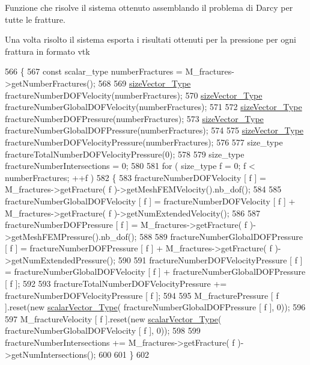 Funzione che risolve il sistema ottenuto assemblando il problema di Darcy per tutte le fratture. 

Una volta risolto il sistema esporta i risultati ottenuti per la pressione per ogni frattura in formato vtk 
\begin{DoxyCode}
566 \{  
567     \textcolor{keyword}{const} scalar\_type numberFractures = M\_fractures->getNumberFractures();
568    
569     \hyperlink{Core_8h_a83c51913d041a5001e8683434c09857f}{sizeVector\_Type} fractureNumberDOFVelocity(numberFractures);
570     \hyperlink{Core_8h_a83c51913d041a5001e8683434c09857f}{sizeVector\_Type} fractureNumberGlobalDOFVelocity(numberFractures);
571 
572     \hyperlink{Core_8h_a83c51913d041a5001e8683434c09857f}{sizeVector\_Type} fractureNumberDOFPressure(numberFractures);
573     \hyperlink{Core_8h_a83c51913d041a5001e8683434c09857f}{sizeVector\_Type} fractureNumberGlobalDOFPressure(numberFractures);
574 
575     \hyperlink{Core_8h_a83c51913d041a5001e8683434c09857f}{sizeVector\_Type} fractureNumberDOFVelocityPressure(numberFractures);
576 
577     size\_type fractureTotalNumberDOFVelocityPressure(0);
578 
579     size\_type fractureNumberIntersections = 0;
580 
581     \textcolor{keywordflow}{for} ( size\_type f = 0; f < numberFractures; ++f )
582     \{
583         fractureNumberDOFVelocity [ f ] = M\_fractures->getFracture( f )->getMeshFEMVelocity().nb\_dof();
584 
585         fractureNumberGlobalDOFVelocity [ f ] = fractureNumberDOFVelocity [ f ] + M\_fractures->getFracture(
       f )->getNumExtendedVelocity();
586 
587         fractureNumberDOFPressure [ f ] = M\_fractures->getFracture( f )->getMeshFEMPressure().nb\_dof();
588 
589         fractureNumberGlobalDOFPressure [ f ] = fractureNumberDOFPressure [ f ] + M\_fractures->getFracture(
       f )->getNumExtendedPressure();
590 
591         fractureNumberDOFVelocityPressure [ f ] = fractureNumberGlobalDOFVelocity [ f ] + 
      fractureNumberGlobalDOFPressure [ f ];
592 
593         fractureTotalNumberDOFVelocityPressure += fractureNumberDOFVelocityPressure [ f ];
594 
595         M\_fracturePressure [ f ].reset(\textcolor{keyword}{new} \hyperlink{Core_8h_a4e75b5863535ba1dd79942de2846eff0}{scalarVector\_Type}( 
      fractureNumberGlobalDOFPressure [ f ], 0));
596 
597         M\_fractureVelocity [ f ].reset(\textcolor{keyword}{new} \hyperlink{Core_8h_a4e75b5863535ba1dd79942de2846eff0}{scalarVector\_Type}( 
      fractureNumberGlobalDOFVelocity [ f ], 0));
598 
599         fractureNumberIntersections += M\_fractures->getFracture( f )->getNumIntersections();
600 
601     \}
602 

\end{DoxyCode}
